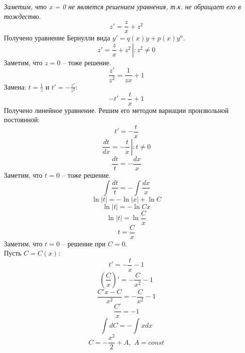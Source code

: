 \documentclass[a5paper, 10pt]{article}
\theoremstyle{definition}
\theoremstyle{plain}
\theoremstyle{remark}
\begin{document}
\textit{Заметим, что x = 0 не является решением уравнения, т.к. не обращает его в тождество}.
\begin{equation*}
z'  =  \frac{z}{x} + z^2 
\end{equation*} 
Получено уравнение Бернулли вида $y' = q(x)y + p(x) y^n$.
\begin{equation*}
z'  =  \frac{z}{x} + z^2  \, \left| \right. :  z^2 \neq 0 
\end{equation*} 
Заметим, что $z = 0$ -- тоже решение.
\begin{equation*}
 \frac{z'}{ z^2}  =  \frac{1}{zx} + 1 
\end{equation*} 
Замена: $t = \frac{1}{z}$ и $t' = - \frac{z'}{z^2}$:
\begin{equation*}
-t'  =  \frac{t}{x} + 1 
\end{equation*} 
Получено линейное уравнение. Решим его методом вариации произвольной постоянной:
\begin{equation*}
t'  =  -\frac{t}{x}
\end{equation*} 
\begin{equation*}
 \frac{dt}{dx}  = - \frac{t}{x} \, \left| \right. :  t \neq 0 
\end{equation*} 
\begin{equation*}
 \frac{dt}{t}  = - \frac{dx}{x} 
\end{equation*} 
Заметим, что $t = 0$ -- тоже решение.
\begin{equation*}
 \int \frac{dt}{t}  =   -  \int \frac{dx}{x} 
\end{equation*} 
\begin{equation*} 
 \ln |t|  =   -  \ln |x| + \ln C
\end{equation*} 
\begin{equation*} 
 \ln |t|  =   -  \ln Cx
\end{equation*} 
\begin{equation*} 
 \ln |t|  = \ln \frac{C }{x}
\end{equation*} 
\begin{equation*} 
 t =  \frac{C }{x}
\end{equation*} 
Заметим, что $t = 0$ -- решение при $C = 0$.\\
Пусть $C = C(x)$:
\begin{equation*}
t'  = -\frac{t}{x} - 1 
\end{equation*} 
\begin{equation*}
\left(  \frac{C}{x} \right)'  = - \frac{C}{x^2} - 1 
\end{equation*}
\begin{equation*}
  \frac{C' x - C }{x^2}   =  - \frac{C}{x^2} - 1
\end{equation*}
\begin{equation*}
  \frac{C'}{x}   =   - 1 
\end{equation*}
\begin{equation*}
 \int dC   =   -\int xdx 
\end{equation*}
\begin{equation*}
  C  =   - \frac{x^2}{2} + A, \, \, A = const
\end{equation*}
\end{document}
